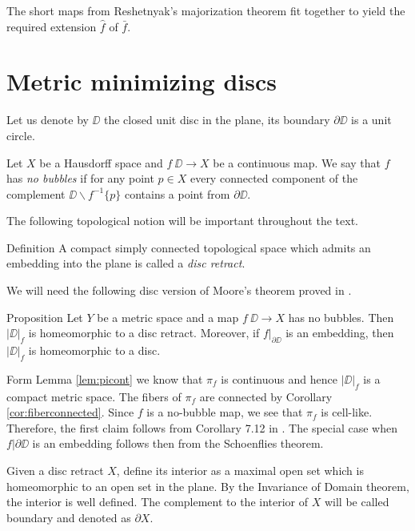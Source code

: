\documentclass{article}
\begin{document}
The short maps from Reshetnyak's majorization theorem fit together to yield the required extension $\hat f$ of $\bar f$.
\qeds







\section{Metric minimizing discs}\label{Metric minimizing discs}



Let us denote by $\DD$ the closed unit disc in the plane,
its boundary $\partial \DD$ is a unit circle.

Let $X$ be a Hausdorff space and
$f\:\DD\to X$ be a continuous map.
We say that $f$ has \emph{no bubbles}\label{page:no-bubble}
if for any point $p\in X$ every connected component of the complement $\DD\backslash f^{-1}\{p\}$ contains a point from $\partial \DD$.

The following topological notion will be important throughout the text.

\begin{thm}{Definition}
A compact simply connected topological space which admits an embedding into the plane is 
called a \emph{disc retract}. 
\end{thm}




We will need the following disc version of Moore's theorem \cite{moore} proved in \cite{LW3}.

\begin{thm}{Proposition}\label{prop:disc-moore}
Let $Y$ be a metric space and a map
$f\:\DD\to X$ has no bubbles.
Then $|\DD|_f$ is homeomorphic to a disc retract.
Moreover, if $f|_{\partial\DD}$ is 
an embedding, then $|\DD|_f$ is homeomorphic to a disc.
\end{thm}


Form Lemma \ref{lem:picont} we know that $\pi_f$ is continuous and hence $|\DD|_f$
is a compact metric space. 
The fibers of $\pi_f$ are connected by Corollary \ref{cor:fiberconnected}.
Since $f$ is a no-bubble map, we see that $\pi_f$ is cell-like. 
Therefore, the first claim follows from 
Corollary 7.12 in \cite{LW3}.
The special case when $f|{\partial\DD}$ is an embedding follows then from the Schoenflies theorem.
\qeds

Given a disc retract $X$,
define its interior as a maximal open set which is homeomorphic to an open set in the plane.
By the Invariance of Domain theorem, the interior is well defined.
The complement to the interior of $X$ will be called boundary and denoted as $\partial X$.
\end{document}
